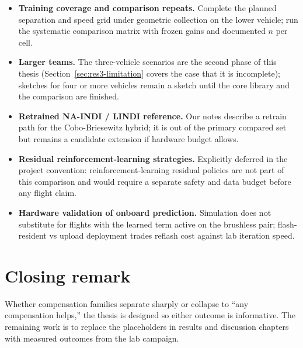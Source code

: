 \begin{itemize}
  \item \textbf{Training coverage and comparison repeats.} Complete the planned separation and speed
    grid under geometric collection on the lower vehicle; run the systematic comparison matrix with frozen gains and documented $n$
    per cell.
  \item \textbf{Larger teams.} The three-vehicle scenarios are the second phase of this thesis
    (Section~\ref{sec:res3-limitation} covers the case that it is incomplete); sketches for four or more vehicles remain
    a sketch until the core library and the comparison are finished.
  \item \textbf{Retrained NA-INDI / LINDI reference.} Our notes describe
    a retrain path for the Cobo-Briesewitz hybrid; it is out of the primary compared set but remains
    a candidate extension if hardware budget allows.
  \item \textbf{Residual reinforcement-learning strategies.} Explicitly deferred in the project convention:
    reinforcement-learning residual policies are not part of this comparison and would require a
    separate safety and data budget before any flight claim.
  \item \textbf{Hardware validation of onboard prediction.} Simulation does not substitute for
    flights with the learned term active on the brushless pair; flash-resident vs upload deployment trades
    reflash cost against lab iteration speed.
\end{itemize}

\section{Closing remark}
\label{sec:conclusion-close}

Whether compensation families separate sharply or collapse to ``any compensation helps,'' the thesis
is designed so either outcome is informative. The remaining work is to replace the placeholders in
results and discussion chapters with measured outcomes from the lab campaign.
